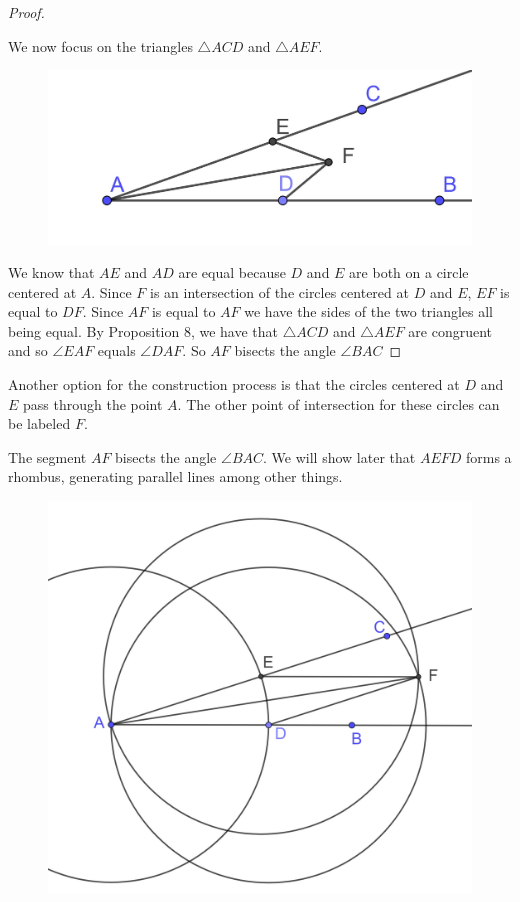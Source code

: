 \documentclass[
]{book}
\theoremstyle{definition}
\theoremstyle{definition}
\theoremstyle{definition}
\theoremstyle{definition}
\theoremstyle{remark}
\begin{document}
\begin{proof}
\begin{figure}
{}

\end{figure}

We now focus on the triangles \(\triangle ACD\) and \(\triangle AEF\).

\begin{figure}

{\centering \includegraphics[width=0.4\linewidth]{images/Prop9d} 

}

\end{figure}

We know that \(AE\) and \(AD\) are equal because \(D\) and \(E\) are both on a circle centered at \(A\). Since \(F\) is an intersection of the circles centered at \(D\) and \(E\), \(EF\) is equal to \(DF\). Since \(AF\) is equal to \(AF\) we have the sides of the two triangles all being equal. By Proposition 8, we have that \(\triangle ACD\) and \(\triangle AEF\) are congruent and so \(\angle EAF\) equals \(\angle DAF\). So \(AF\) bisects the angle \(\angle BAC\)

\end{proof}

Another option for the construction process is that the circles centered at \(D\) and \(E\) pass through the point \(A\). The other point of intersection for these circles can be labeled \(F\).

The segment \(AF\) bisects the angle \(\angle BAC\). We will show later that \(AEFD\) forms a rhombus, generating parallel lines among other things.

\begin{figure}

{\centering \includegraphics[width=0.4\linewidth]{images/Prop9e} 

}

\end{figure}
\end{document}

